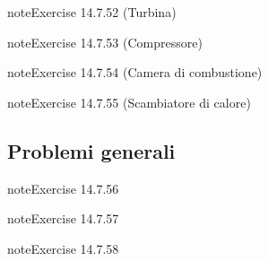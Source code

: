 \documentclass[letterpaper,10pt,italian]{jupyterBook}
\begin{document}
\begin{sphinxadmonition}{note}{Exercise 14.7.52 (Turbina)}


\end{sphinxadmonition}
 \label{exercise:ch/thermodynamics/principles-problems-exercise-52}

\begin{sphinxadmonition}{note}{Exercise 14.7.53 (Compressore)}


\end{sphinxadmonition}
 \label{exercise:ch/thermodynamics/principles-problems-exercise-53}

\begin{sphinxadmonition}{note}{Exercise 14.7.54 (Camera di combustione)}


\end{sphinxadmonition}
 \label{exercise:ch/thermodynamics/principles-problems-exercise-54}

\begin{sphinxadmonition}{note}{Exercise 14.7.55 (Scambiatore di calore)}


\end{sphinxadmonition}


\subsection{Problemi generali}
\label{\detokenize{ch/thermodynamics/principles-problems:problemi-generali}} \label{exercise:ch/thermodynamics/principles-problems-exercise-55}

\begin{sphinxadmonition}{note}{Exercise 14.7.56}


\end{sphinxadmonition}
 \label{exercise:ch/thermodynamics/principles-problems-exercise-56}

\begin{sphinxadmonition}{note}{Exercise 14.7.57}


\end{sphinxadmonition}
 \label{exercise:ch/thermodynamics/principles-problems-exercise-57}

\begin{sphinxadmonition}{note}{Exercise 14.7.58}


\end{sphinxadmonition}

\sphinxstepscope
\end{document}
